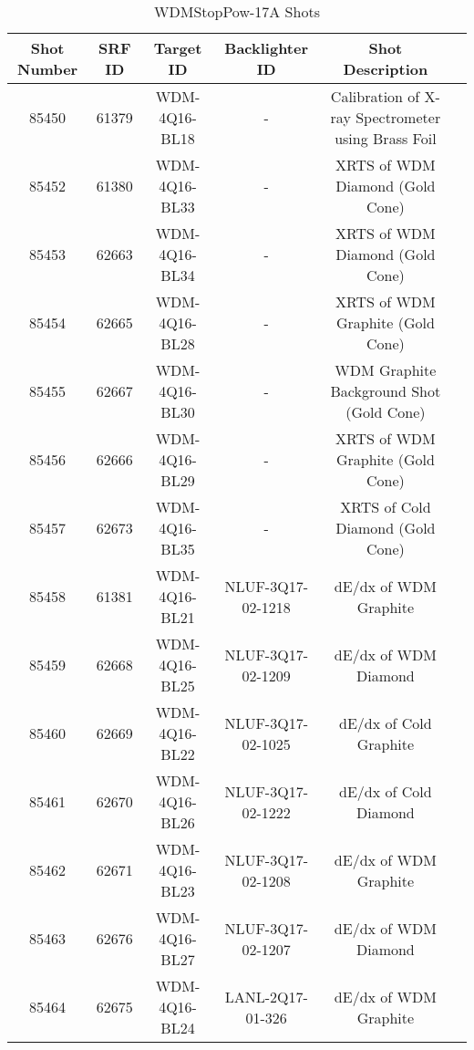 \begin{sidewaystable}[h!]
    \def\arraystretch{1.5}
    \centering
    \begin{tabular}{c c c c c c}
    Shot Number & SRF ID & Target ID & Backlighter ID & Shot Description \\
    \hline
85450 & 61379 & WDM-4Q16-BL18 & - & Calibration of X-ray Spectrometer using Brass Foil\\
85452 & 61380 & WDM-4Q16-BL33 & - & XRTS of WDM Diamond (Gold Cone)\\
85453 & 62663 & WDM-4Q16-BL34 & - & XRTS of WDM Diamond (Gold Cone)\\
85454 & 62665 & WDM-4Q16-BL28 & - & XRTS of WDM Graphite (Gold Cone)\\
85455 & 62667 & WDM-4Q16-BL30 & - & WDM Graphite Background Shot (Gold Cone)\\
85456 & 62666 & WDM-4Q16-BL29 & - & XRTS of WDM Graphite (Gold Cone)\\
85457 & 62673 & WDM-4Q16-BL35 & - & XRTS of Cold Diamond (Gold Cone)\\
85458 & 61381 & WDM-4Q16-BL21 & NLUF-3Q17-02-1218 & dE/dx of WDM Graphite\\
85459 & 62668 & WDM-4Q16-BL25 & NLUF-3Q17-02-1209 & dE/dx of WDM Diamond\\
85460 & 62669 & WDM-4Q16-BL22 & NLUF-3Q17-02-1025 & dE/dx of Cold Graphite\\
85461 & 62670 & WDM-4Q16-BL26 & NLUF-3Q17-02-1222 & dE/dx of Cold Diamond\\
85462 & 62671 & WDM-4Q16-BL23 & NLUF-3Q17-02-1208 & dE/dx of WDM Graphite\\
85463 & 62676 & WDM-4Q16-BL27 & NLUF-3Q17-02-1207 & dE/dx of WDM Diamond\\
85464 & 62675 & WDM-4Q16-BL24 & LANL-2Q17-01-326 & dE/dx of WDM Graphite\\
    \end{tabular}
    \caption{WDMStopPow-17A Shots}
    \label{tab:my_label}
\end{sidewaystable}

